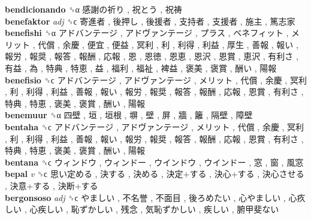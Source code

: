 \textbf{bendicionando} ␝α   感謝の祈り ,  祝とう ,  祝祷   \\
\textbf{benefaktor} \emph{adj}  ␝ϲ   寄進者 ,  後押し ,  後援者 ,  支持者 ,  支援者 ,  施主 ,  篤志家   \\
\textbf{benefishi} ␝α   アドバンテージ ,  アドヴァンテージ ,  プラス ,  ベネフィット ,  メリット ,  代償 ,  余慶 ,  便宜 ,  便益 ,  冥利 ,  利 ,  利得 ,  利益 ,  厚生 ,  善報 ,  報い ,  報労 ,  報奨 ,  報答 ,  報酬 ,  応報 ,  恩 ,  恩徳 ,  恩恵 ,  恩沢 ,  恩賞 ,  恵沢 ,  有利さ ,  有益 ,  為 ,  特典 ,  特恵 ,  益 ,  福利 ,  福祉 ,  裨益 ,  褒美 ,  褒賞 ,  酬い ,  陽報   \\
\textbf{benefisio} ␝ϲ   アドバンテージ ,  アドヴァンテージ ,  メリット ,  代償 ,  余慶 ,  冥利 ,  利 ,  利得 ,  利益 ,  善報 ,  報い ,  報労 ,  報奨 ,  報答 ,  報酬 ,  応報 ,  恩賞 ,  有利さ ,  特典 ,  特恵 ,  褒美 ,  褒賞 ,  酬い ,  陽報   \\
\textbf{benemuur} ␝α   四壁 ,  垣 ,  垣根 ,  塀 ,  壁 ,  屏 ,  牆 ,  籬 ,  隔壁 ,  障壁   \\
\textbf{bentaha} ␝ϲ   アドバンテージ ,  アドヴァンテージ ,  メリット ,  代償 ,  余慶 ,  冥利 ,  利 ,  利得 ,  利益 ,  善報 ,  報い ,  報労 ,  報奨 ,  報答 ,  報酬 ,  応報 ,  恩賞 ,  有利さ ,  特典 ,  特恵 ,  褒美 ,  褒賞 ,  酬い ,  陽報   \\
\textbf{bentana} ␝ϲ   ウィンドウ ,  ウィンドー ,  ウインドウ ,  ウインドー ,  窓 ,  窗 ,  風窓   \\
\textbf{bepal} \emph{v}  ␝ϲ   思い定める ,  決する ,  決める ,  決定+する ,  決心+する ,  決心させる ,  決意+する ,  決断+する   \\
\textbf{bergonsoso} \emph{adj}  ␝ϲ   やましい ,  不名誉 ,  不面目 ,  後ろめたい ,  心やましい ,  心疚しい ,  心疾しい ,  恥ずかしい ,  残念 ,  気恥ずかしい ,  疾しい ,  腑甲斐ない   \\
